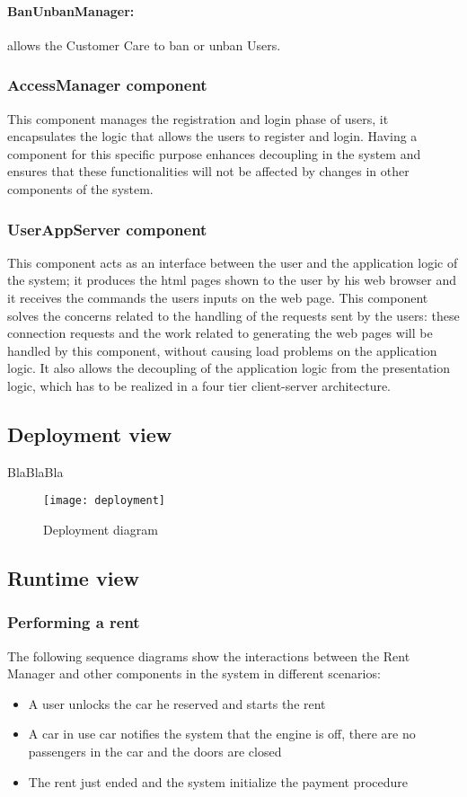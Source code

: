 \paragraph{BanUnbanManager:} allows the Customer Care to ban or unban Users.
\subsubsection{AccessManager component}
This component manages the registration and login phase of users, it encapsulates the logic that allows the users to register and login. Having a component for this specific purpose enhances decoupling in the system and ensures that these functionalities will not be affected by changes in other components of the system.

\subsubsection{UserAppServer component}
This component acts as an interface between the user and the application logic of the system; it produces the html pages shown to the user by his web browser and it receives the commands the users inputs on the web page. This component solves the concerns related to the handling of the requests sent by the users: these connection requests and the work related to generating the web pages will be handled by this component, without causing load problems on the application logic. It also allows the decoupling of the application logic from the presentation logic, which has to be realized in a four tier client-server architecture.
\clearpage

\subsection{Deployment view}
BlaBlaBla
\begin{figure}[h!]
	\centering
	\texttt{[image: deployment]}
	\caption{
		\label{fig:deployment} 
		Deployment diagram
	}
\end{figure}

\clearpage
\subsection{Runtime view}
\subsubsection{Performing a rent}
The following sequence diagrams show the interactions between the Rent Manager and other components in the system in different scenarios:
\begin{itemize}
	\item A user unlocks the car he reserved and starts the rent
	\item A car in use car notifies the system that the engine is off, there are no passengers in the car and the doors are closed
	\item The rent just ended and the system initialize the payment procedure
\end{itemize}

